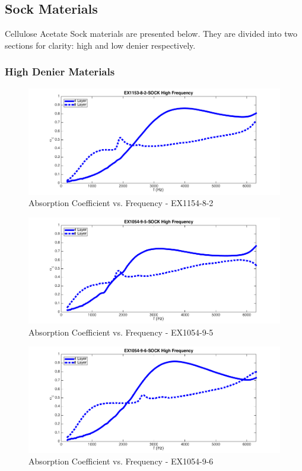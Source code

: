 \subsection{Sock Materials}
Cellulose Acetate Sock materials are presented below. They are divided into two sections for clarity: high and low denier respectively.
\clearpage

\subsubsection{High Denier Materials}
\begin{figure}[hbtp]
    \centering
    \includegraphics[width=1\textwidth]{Chapter-4/figs/AfigSOCK8-2}
    \caption{Absorption Coefficient vs. Frequency - EX1154-8-2}
    \label{fig:AfigSOCK8-2}
\end{figure}

\begin{figure}[hbtp]
    \centering
    \includegraphics[width=1\textwidth]{Chapter-4/figs/AfigSOCK9-5}
    \caption{Absorption Coefficient vs. Frequency - EX1054-9-5}
    \label{fig:AfigSOCK9-5}
\end{figure}

\begin{figure}[hbtp]
    \centering
    \includegraphics[width=1\textwidth]{Chapter-4/figs/AfigSOCK9-6}
    \caption{Absorption Coefficient vs. Frequency - EX1054-9-6}
    \label{fig:AfigSOCK9-6}
\end{figure}

